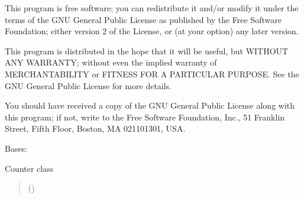 \documentclass[letterpaper,10pt,english]{sphinxmanual}
\begin{document}
\sphinxAtStartPar
This program is free software; you can redistribute it and/or
modify it under the terms of the GNU General Public License
as published by the Free Software Foundation; either version 2
of the License, or (at your option) any later version.

\sphinxAtStartPar
This program is distributed in the hope that it will be useful,
but WITHOUT ANY WARRANTY; without even the implied warranty of
MERCHANTABILITY or FITNESS FOR A PARTICULAR PURPOSE.  See the
GNU General Public License for more details.

\sphinxAtStartPar
You should have received a copy of the GNU General Public License
along with this program; if not, write to the Free Software
Foundation, Inc., 51 Franklin Street, Fifth Floor, Boston, MA  02110\sphinxhyphen{}1301, USA.

\begin{fulllineitems}
\label{\detokenize{api/killMS.Other:killMS.Other.Counter.Counter}}
\pysigstartsignatures
{}
\pysigstopsignatures
\sphinxAtStartPar
Bases: 

\sphinxAtStartPar
Counter class
\begin{quote}\begin{description}
\sphinxAtStartPar
{} () \textendash{} 

\end{description}\end{quote}

\end{fulllineitems}

\end{document}
